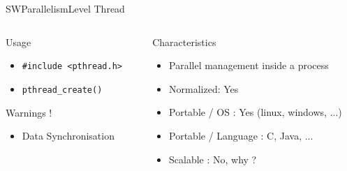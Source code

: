 %
\begin{Frame}{SWParallelismLevel Thread}
  \begin{columns}[t]
    \begin{column}{\HW} %
      \begin{block}{Usage}
        \begin{itemize}
        \item \texttt{\#include <pthread.h>}
        \item \texttt{pthread\_create()}
        \end{itemize}
      \end{block} 
      \begin{alertblock}{Warnings !}
        \begin{itemize}
        \item Data Synchronisation
        \end{itemize}
      \end{alertblock} 
    \end{column}
    \begin{column}{\HW} %
      \begin{alertblock}{Characteristics}
        \begin{itemize}
        \item Parallel management inside a process
        \item Normalized: Yes 
        \item Portable / OS : Yes (linux, windows, ...)
        \item Portable / Language : C, Java, ...
        \item Scalable : No, why ?
        \end{itemize}
      \end{alertblock}   
    \end{column}
  \end{columns}  
\end{Frame}


